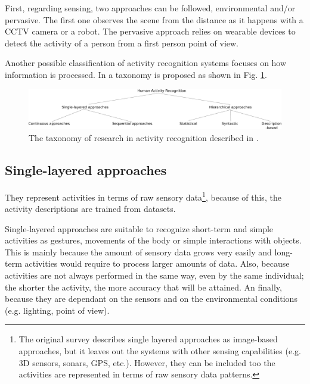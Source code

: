 First, regarding sensing, two approaches can be followed, environmental and/or pervasive. 
The first one observes the scene from the distance as it happens with a CCTV camera or a robot. 
The pervasive approach relies on wearable devices to detect the activity of a person from a first person point of view.

Another possible classification of activity recognition systems focuses on how information is processed.
In \citep{Aggarwal11_HumanActivity} a taxonomy is proposed as shown in Fig. \ref{fig:taxonomy}.  

\begin{figure}[h]
\centering
\includegraphics[width=\textwidth]{fig/img_Aggarwal_Taxonomy2.pdf}
\caption{The taxonomy of research in activity recognition described in \cite{Aggarwal11_HumanActivity}.}
\label{fig:taxonomy}
\end{figure}

\subsection{Single-layered approaches}
They represent activities in terms of raw sensory data\footnote{The original survey \citep{Aggarwal11_HumanActivity} describes single layered approaches as image-based approaches, but it leaves out the systems with other sensing capabilities (e.g. 3D sensors, sonars, GPS, etc.).
However, they can be included too the activities are represented in terms of raw sensory data patterns.}, because of this, the activity descriptions are trained from datasets.


Single-layered approaches are suitable to recognize short-term and simple activities as gestures, movements of the body or simple interactions with objects. 
This is mainly because the amount of sensory data grows very easily and long-term activities would require to process larger amounts of data. 
Also, because activities are not always performed in the same way, even by the same individual; the shorter the activity, the more accuracy that will be attained.
An finally, because they are dependant on the sensors and on the environmental conditions (e.g. lighting, point of view).


